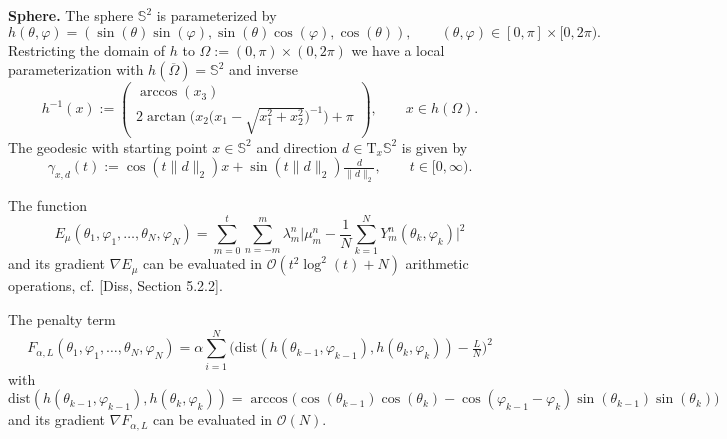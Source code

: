\documentclass[%
a4paper,11pt,DIV=11,%
abstract=on%
]{scrartcl}
\begin{document}
\textbf{Sphere.} The sphere $\mathbb S^{2}$ is parameterized by
\[
  h(\theta,\varphi) = (\sin(\theta) \sin(\varphi), \sin(\theta) \cos(\varphi), \cos(\theta)), \qquad (\theta,\varphi) \in [0,\pi]\times [0,2\pi).
\]
Restricting the domain of $h$ to $\Omega := (0,\pi)\times (0,2\pi)$ we have a local parameterization with $h(\overline \Omega) = \mathbb S^{2}$ and inverse
\[
  h^{-1}(x) :=  \begin{pmatrix}
    \arccos(x_{3}) \\
    2 \arctan \Big( x_{2}  \Big(x_{1} - \sqrt{x_{1}^{2}+x_{2}^{2}}\Big)^{-1} \Big) + \pi
  \end{pmatrix}
  , \qquad x \in h(\Omega).
\]
The geodesic with starting point $x \in \mathbb S^{2}$ and direction $d \in \mathrm T_{x}\mathbb S^{2}$ is given by
\[
  \gamma_{x,d}(t) := \cos(t \|d\|_{2}) x + \sin(t \|d\|_{2}) \tfrac{d}{\|d\|_{2}}, \qquad t \in [0,\infty).
\]

The function
\[
  E_{\mu}(\theta_{1},\varphi_{1},\dots,\theta_{N},\varphi_{N}) = \sum_{m=0}^{t} \sum_{n=-m}^{m} \lambda_{m}^{n} \Big| \mu_{m}^{n} - \frac 1N \sum_{k=1}^{N} Y_{m}^{n}(\theta_{k},\varphi_{k})\Big|^{2}
\]
and its gradient $\nabla E_{\mu}$ can be evaluated in $\mathcal O(t^{2} \log^{2}(t) + N)$ arithmetic operations, cf. {\color{blue}[Diss, Section 5.2.2]}.

The penalty term
\[
  F_{\alpha,L}(\theta_{1},\varphi_{1},\dots,\theta_{N},\varphi_{N}) = \alpha \sum_{i=1}^{N} \big(  \mathrm{dist}(h(\theta_{k-1},\varphi_{k-1}),h(\theta_{k},\varphi_{k})) - \tfrac{L}{N}\big)^{2}
\]
with
\[
  \mathrm{dist}(h(\theta_{k-1},\varphi_{k-1}),h(\theta_{k},\varphi_{k})) = \arccos \Big( \cos(\theta_{k-1}) \cos(\theta_{k}) - \cos(\varphi_{k-1}-\varphi_{k}) \sin(\theta_{k-1})\sin(\theta_{k})\Big)
\]
and its gradient $\nabla F_{\alpha,L}$ can be evaluated in $\mathcal O(N)$.
\end{document}

